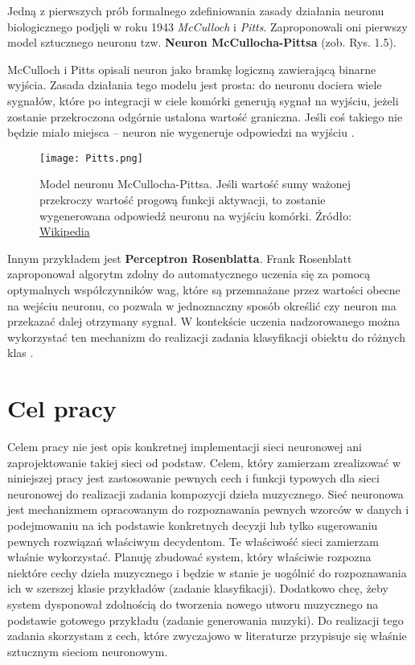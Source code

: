 Jedną z pierwszych prób formalnego zdefiniowania zasady działania neuronu biologicznego podjęli w roku 1943 \textit{McCulloch} i \textit{Pitts}. Zaproponowali oni pierwszy model sztucznego neuronu tzw. \textbf{Neuron McCullocha-Pittsa} (zob. Rys. 1.5).

McCulloch i Pitts opisali neuron jako bramkę logiczną zawierającą binarne wyjścia. Zasada działania tego modelu jest prosta: do neuronu dociera wiele sygnałów, które po integracji w ciele komórki generują sygnał na wyjściu, jeżeli zostanie przekroczona odgórnie ustalona wartość graniczna. Jeśli coś takiego nie będzie miało miejsca -- neuron nie wygeneruje odpowiedzi na wyjściu \citep[s. 40]{Raschka_2019}.
\begin{figure}[H]
\begin{center}
\texttt{[image: Pitts.png]}
\caption{Model neuronu McCullocha-Pittsa. Jeśli wartość sumy ważonej przekroczy wartość progową funkcji aktywacji, to zostanie wygenerowana odpowiedź neuronu na wyjściu komórki. Źródło: \href{https://pl.wikipedia.org/wiki/Neuron_McCullocha-Pittsa}{Wikipedia}}
\centering
\end{center}
\end{figure}
Innym przykładem jest \textbf{Perceptron Rosenblatta}. Frank Rosenblatt zaproponował algorytm zdolny do automatycznego uczenia się za pomocą optymalnych współczynników wag, które są przemnażane przez wartości obecne na wejściu neuronu, co pozwala w jednoznaczny sposób określić czy neuron ma przekazać dalej otrzymany sygnał. W kontekście uczenia nadzorowanego można wykorzystać ten mechanizm do realizacji zadania klasyfikacji obiektu do różnych klas \citep[s.40]{Raschka_2019}.

\section{Cel pracy}

Celem pracy nie jest opis konkretnej implementacji sieci neuronowej ani zaprojektowanie takiej sieci od podstaw. Celem, który zamierzam zrealizować w niniejszej pracy jest  zastosowanie pewnych cech i funkcji typowych dla sieci neuronowej do realizacji zadania kompozycji dzieła muzycznego. Sieć neuronowa jest mechanizmem opracowanym do rozpoznawania pewnych wzorców w danych i podejmowaniu na ich podstawie konkretnych decyzji lub tylko sugerowaniu pewnych rozwiązań właściwym decydentom. Te właściwość sieci zamierzam właśnie wykorzystać. Planuję zbudować system, który właściwie rozpozna niektóre  cechy dzieła muzycznego i będzie w stanie je uogólnić do rozpoznawania ich  w szerszej klasie przykładów (zadanie klasyfikacji). Dodatkowo chcę, żeby system dysponował zdolnością do tworzenia nowego utworu muzycznego na podstawie gotowego przykładu (zadanie generowania muzyki). Do realizacji tego zadania skorzystam z cech, które zwyczajowo w literaturze przypisuje się właśnie sztucznym sieciom neuronowym.   
